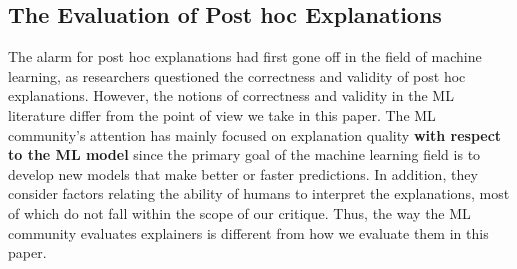 \documentclass[12pt]{article}  %
\begin{document}
    \subsection{The Evaluation of Post hoc Explanations}
        \label{sec:cs_critique}
        The alarm for post hoc explanations had first gone off in the field of machine learning, as researchers questioned the correctness and validity of post hoc explanations. However, the notions of correctness and validity in the ML literature differ from the point of view we take in this paper. The ML community's attention has mainly focused on explanation quality \textbf{with respect to the ML model} since the primary goal of the machine learning field is to develop new models that make better or faster predictions. In addition, they consider factors relating the ability of humans to interpret the explanations, most of which do not fall within the scope of our critique. Thus, the way the ML community evaluates explainers is different from how we evaluate them in this paper.
\end{document}
